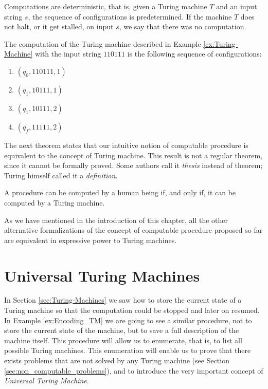 Computations are deterministic, that is, given a Turing machine $T$ and an input string $s$, the sequence of configurations is predetermined. If the machine $T$ does not halt, or it get stalled, on input $s$, we say that there was no computation.

\begin{example}
The computation of the Turing machine described in Example \ref{ex:Turing-Machine} with the input string $110111$ is the following sequence of configurations:

\begin{enumerate}
\item $(q_0, 110111, 1)$
\item $(q_1, 10111,  1)$
\item $(q_1, 10111,  2)$  
\item $(q_f, 11111,  2)$  
\end{enumerate}

\end{example}

The next theorem states that our intuitive notion of computable procedure is equivalent to the concept of Turing machine. This result is not a regular theorem, since it cannot be formally proved. Some authors call it \emph{thesis} instead of theorem; Turing himself called it a \emph{definition}.

\begin{theorem}
\label{th:turing_thesis}
A procedure can be computed by a human being if, and only if, it can be computed by a Turing machine.
\end{theorem}

As we have mentioned in the introduction of this chapter, all the other alternative formalizations of the concept of computable procedure proposed so far are equivalent in expressive power to Turing machines. 

%
%

\section{Universal Turing Machines}
\label{sec:Universal-Turing-Machines}

In Section \ref{sec:Turing-Machines} we saw how to store the current state of a Turing machine so that the computation could be stopped and later on resumed. In Example \ref{ex:Encoding_TM} we are going to see a similar procedure, not to store the current state of the machine, but to save a full description of the machine itself. This procedure will allow us to enumerate, that is, to list all possible Turing machines. This enumeration will enable us to prove that there exists problems that are not solved by any Turing machine (see Section \ref{sec:non_computable_problems}), and to introduce the very important concept of \emph{Universal Turing Machine}.

